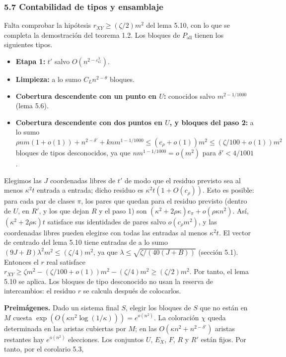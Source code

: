 \documentclass[spanish,11pt,a4paper]{article}
\providecommand{\tightlist}{\setlength{\itemsep}{0pt}\setlength{\parskip}{0pt}}
\begin{document}
\subsubsection{5.7 Contabilidad de tipos y ensamblaje}\label{contabilidad-de-tipos-y-ensamblaje}

Falta comprobar la hipótesis \(r_{XY}\ge(\zeta/2)m^2\) del lema 5.10, con lo que se completa la demostración del teorema 1.2. Los bloques de \(P_{\mathrm{all}}\) tienen los siguientes tipos.

\begin{itemize}
\tightlist
\item
  \textbf{Etapa 1:} \(t'\) salvo \(O(n^{2-\varepsilon_G^3})\).
\item
  \textbf{Limpieza:} a lo sumo \(C_Ln^{2-\theta}\) bloques.
\item
  \textbf{Cobertura descendente con un punto en \(U\):} conocidos salvo \(m^{2-1/1000}\) (lema 5.6).
\item
  \textbf{Cobertura descendente con dos puntos en \(U\), y bloques del paso 2:} a lo sumo \(\rho nm(1+o(1))+n^{2-\delta'}+knm^{1-1/1000}\le(c_\rho+o(1))m^2\le(\zeta/100+o(1))m^2\) bloques de tipos desconocidos, ya que \(nm^{1-1/1000}=o(m^2)\) para \(\delta'<4/1001\).
\end{itemize}

Elegimos las \(J\) coordenadas libres de \(t'\) de modo que el residuo previsto sea al menos \(\kappa^2t\) entrada a entrada; dicho residuo es \(\kappa^2t(1+O(c_\rho))\). Esto es posible: para cada par de clases \(\pi\), los pares que quedan para el residuo previsto (dentro de \(U\), en \(R'\), y los que dejan \(R\) y el paso 1) son \((\kappa^2+2\rho\kappa)e_\pi+o(\rho\kappa n^2)\). Así, \((\kappa^2+2\rho\kappa)t\) satisface sus identidades de pares salvo \(o(c_\rho m^2)\), y las coordenadas libres pueden elegirse con todas las entradas al menos \(\kappa^2t\). El vector de centrado del lema 5.10 tiene entradas de a lo sumo \((9J+B)\lambda^2m^2\le(\zeta/4)m^2\), ya que \(\lambda\le\sqrt{\zeta/(40(J+B))}\) (sección 5.1). Entonces el \(r\) real satisface \(r_{XY}\ge\zeta m^2-(\zeta/100+o(1))m^2-(\zeta/4)m^2\ge(\zeta/2)m^2\). Por tanto, el lema 5.10 se aplica. Los bloques de tipo desconocido no usan la reserva de intercambios: el residuo \(r\) se calcula después de colocarlos.

\textbf{Preimágenes.} Dado un sistema final \(S\), elegir los bloques de \(S\) que no están en \(M\) cuesta \(\exp(O(\kappa n^2\log(1/\kappa)))=e^{o(n^2)}\). La coloración \(\chi\) queda determinada en las aristas cubiertas por \(M\); en las \(O(\kappa n^2+n^{2-\delta'})\) aristas restantes hay \(e^{o(n^2)}\) elecciones. Los conjuntos \(U\), \(E_X\), \(F\), \(R\) y \(R'\) están fijos. Por tanto, por el corolario 5.3,
\end{document}
